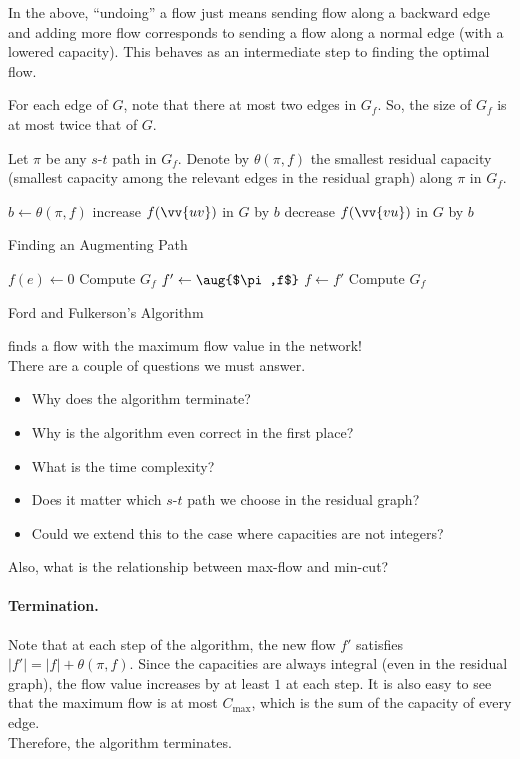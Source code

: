 In the above, ``undoing'' a flow just means sending flow along a backward edge and adding more flow corresponds to sending a flow along a normal edge (with a lowered capacity). This behaves as an intermediate step to finding the optimal flow.

For each edge of $G$, note that there at most two edges in $G_f$. So, the size of $G_f$ is at most twice that of $G$.

Let $\pi$ be any $s$-$t$ path in $G_f$. Denote by $\theta(\pi,f)$ the smallest residual capacity (smallest capacity among the relevant edges in the residual graph) along $\pi$ in $G_f$.

\begin{algorithm}[H]
	\DontPrintSemicolon
	\SetNoFillComment
	 {
		$b\gets\theta(\pi,f)$\;
		 {
			 {
				increase $f(\vv{uv})$ in $G$ by $b$
			} {
				decrease $f(\vv{vu})$ in $G$ by $b$
			}
		}
	}
	\caption{Finding an Augmenting Path}\label{algo: aug path}
\end{algorithm}

\begin{algorithm}[H]
	\DontPrintSemicolon
	\SetNoFillComment
	 {
		$f(e)\gets 0$
	}
	Compute $G_f$\;
	 {
		$f'\gets\aug{$\pi,f$}$\;
		$f\gets f'$\;
		Compute $G_f$
	}
	\;
	\caption{Ford and Fulkerson's Algorithm}\label{algo: max flow}
\end{algorithm}

 finds a flow with the maximum flow value in the network!\\
There are a couple of questions we must answer.
\begin{itemize}
	\item Why does the algorithm terminate?
	\item Why is the algorithm even correct in the first place?
	\item What is the time complexity?
	\item Does it matter which $s$-$t$ path we choose in the residual graph?
	\item Could we extend this to the case where capacities are not integers?
\end{itemize}

Also, what is the relationship between max-flow and min-cut?

\paragraph{Termination.} Note that at each step of the algorithm, the new flow $f'$ satisfies $|f'|=|f|+\theta(\pi,f)$. Since the capacities are always integral (even in the residual graph), the flow value increases by at least $1$ at each step. It is also easy to see that the maximum flow is at most $C_{\text{max}}$, which is the sum of the capacity of every edge.\\
Therefore, the algorithm terminates.

